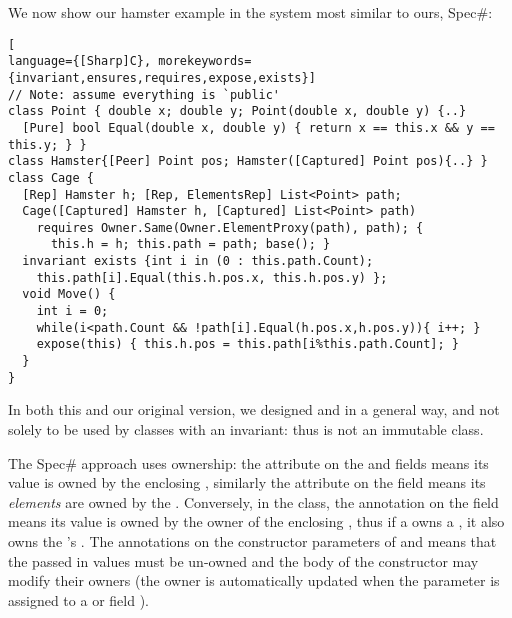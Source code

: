 We now show our hamster example in the system most similar to ours, Spec\#:
\begin{lstlisting}[
language={[Sharp]C}, morekeywords={invariant,ensures,requires,expose,exists}]
// Note: assume everything is `public'
class Point { double x; double y; Point(double x, double y) {..}
  [Pure] bool Equal(double x, double y) { return x == this.x && y == this.y; } }
class Hamster{[Peer] Point pos; Hamster([Captured] Point pos){..} }
class Cage {
  [Rep] Hamster h; [Rep, ElementsRep] List<Point> path;
  Cage([Captured] Hamster h, [Captured] List<Point> path)
    requires Owner.Same(Owner.ElementProxy(path), path); {
      this.h = h; this.path = path; base(); }
  invariant exists {int i in (0 : this.path.Count);
    this.path[i].Equal(this.h.pos.x, this.h.pos.y) };
  void Move() {
    int i = 0;
    while(i<path.Count && !path[i].Equal(h.pos.x,h.pos.y)){ i++; }
    expose(this) { this.h.pos = this.path[i%this.path.Count]; }
  }
}
\end{lstlisting}

In both this and our original version, we designed \Q@Point@ and \Q@Hamster@ in a general way, and not solely to be used by classes with an invariant: thus \Q@Point@ is not an immutable class.

The Spec\# approach uses ownership: the \Q@Rep@ attribute on the \Q@h@ and \Q@path@ fields means its value is owned by the enclosing \Q@Cage@, similarly the \Q@ElementsRep@ attribute on the \Q@path@ field means its \emph{elements} are owned by the \Q@Cage@. Conversely, in the \Q@Hamster@ class, the \Q@Peer@ annotation on the \Q@pos@ field means its value is owned by the owner of the enclosing \Q@Hamster@, thus if a \Q@Cage@ owns a \Q@Hamster@, it also owns the \Q@Hamster@'s \Q@pos@. The \Q@Captured@ annotations on the constructor parameters of \Q@Cage@ and \Q@Hamster@ means that the passed in values must be un-owned and the body of the constructor may modify their owners (the owner is automatically updated when the parameter is assigned to a \Q@Rep@ or \Q@Peer@ field
%
).

